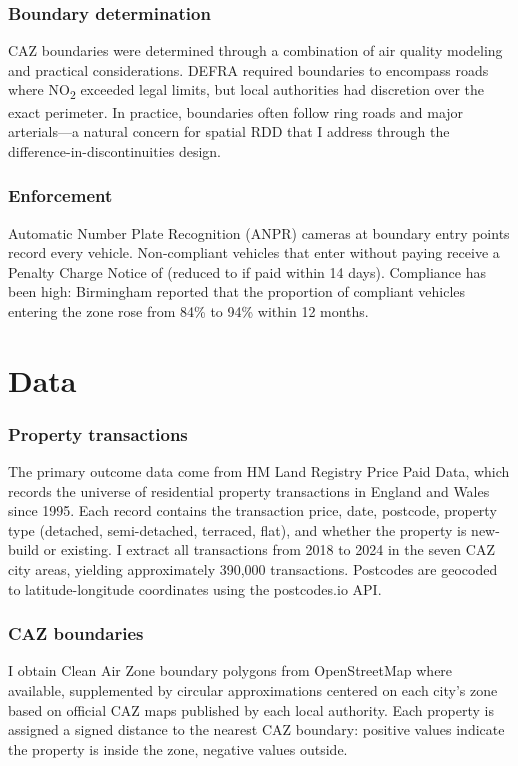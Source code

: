 \documentclass[12pt]{article}
\begin{document}
\subsubsection*{Boundary determination} CAZ boundaries were determined through a combination of air quality modeling and practical considerations. DEFRA required boundaries to encompass roads where NO\textsubscript{2} exceeded legal limits, but local authorities had discretion over the exact perimeter. In practice, boundaries often follow ring roads and major arterials---a natural concern for spatial RDD that I address through the difference-in-discontinuities design.

\subsubsection*{Enforcement} Automatic Number Plate Recognition (ANPR) cameras at boundary entry points record every vehicle. Non-compliant vehicles that enter without paying receive a Penalty Charge Notice of  (reduced to  if paid within 14 days). Compliance has been high: Birmingham reported that the proportion of compliant vehicles entering the zone rose from 84\% to 94\% within 12 months.

\section{Data}\label{sec:data}

\subsubsection*{Property transactions} The primary outcome data come from HM Land Registry Price Paid Data, which records the universe of residential property transactions in England and Wales since 1995. Each record contains the transaction price, date, postcode, property type (detached, semi-detached, terraced, flat), and whether the property is new-build or existing. I extract all transactions from 2018 to 2024 in the seven CAZ city areas, yielding approximately 390,000 transactions. Postcodes are geocoded to latitude-longitude coordinates using the postcodes.io API.

\subsubsection*{CAZ boundaries} I obtain Clean Air Zone boundary polygons from OpenStreetMap where available, supplemented by circular approximations centered on each city's zone based on official CAZ maps published by each local authority. Each property is assigned a signed distance to the nearest CAZ boundary: positive values indicate the property is inside the zone, negative values outside.
\end{document}
